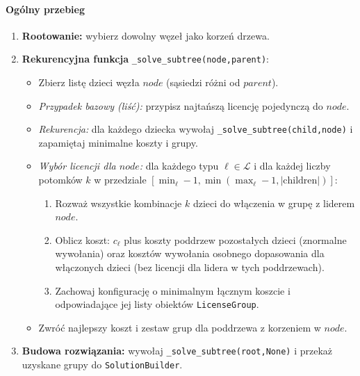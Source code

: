 \paragraph{Ogólny przebieg}  
\begin{enumerate}
  \item \textbf{Rootowanie:} wybierz dowolny węzeł jako korzeń drzewa.
  \item \textbf{Rekurencyjna funkcja} \texttt{\_solve\_subtree(node,parent)}:
    \begin{itemize}
      \item Zbierz listę dzieci węzła $node$ (sąsiedzi różni od $parent$).
      \item \emph{Przypadek bazowy (liść):} przypisz najtańszą licencję pojedynczą do $node$.
      \item \emph{Rekurencja:} dla każdego dziecka wywołaj \texttt{\_solve\_subtree(child,node)} i zapamiętaj minimalne koszty i grupy.
      \item \emph{Wybór licencji dla $node$:} dla każdego typu $\ell\in\mathcal{L}$ i dla każdej liczby potomków $k$ w przedziale $[\min_\ell-1,\min(\max_\ell-1,|\text{children}|)]$:
        \begin{enumerate}
          \item Rozważ wszystkie kombinacje $k$ dzieci do włączenia w grupę z liderem $node$.
          \item Oblicz koszt: $c_\ell$ plus koszty poddrzew pozostałych dzieci (znormalne wywołania) oraz kosztów wywołania osobnego dopasowania dla włączonych dzieci (bez licencji dla lidera w tych poddrzewach).
          \item Zachowaj konfigurację o minimalnym łącznym koszcie i odpowiadające jej listy obiektów \texttt{LicenseGroup}.
        \end{enumerate}
      \item Zwróć najlepszy koszt i zestaw grup dla poddrzewa z korzeniem w $node$.
    \end{itemize}
  \item \textbf{Budowa rozwiązania:} wywołaj \texttt{\_solve\_subtree(root,None)} i przekaż uzyskane grupy do \texttt{SolutionBuilder}.
\end{enumerate}

